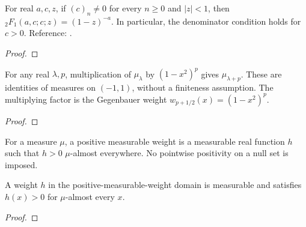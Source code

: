 \begin{supporting}
\begin{theorem}
\label{thm:hypergeometric-cancellation}
\leanok
For real $a,c,z$, if $(c)_n\ne0$ for every $n\ge0$ and $|z|<1$, then
${}_2F_1(a,c;c;z)=(1-z)^{-a}$. In particular, the denominator condition
holds for $c>0$. Reference: \cite[15.4.6]{dlmf}.
\end{theorem}
\begin{proof}
\leanok
\end{proof}

\begin{theorem}
\label{thm:gegenbauer-density-shift}
\leanok
For any real $\lambda,p$, multiplication of $\mu_\lambda$ by
$(1-x^2)^p$ gives $\mu_{\lambda+p}$. These are identities of measures
on $(-1,1)$, without a finiteness assumption. The multiplying factor is
the Gegenbauer weight $w_{p+1/2}(x)=(1-x^2)^p$.
\end{theorem}
\begin{proof}
\leanok
\end{proof}

\begin{definition}
\label{def:positive-measurable-weight}
\leanok
For a measure $\mu$, a positive measurable weight is a measurable real function $h$ such that $h>0$ $\mu$-almost everywhere.
No pointwise positivity on a null set is imposed.
\end{definition}
\begin{theorem}
\label{thm:positive-measurable-weight}
\leanok
A weight $h$ in the positive-measurable-weight domain is measurable and
satisfies $h(x)>0$ for $\mu$-almost every $x$.
\end{theorem}
\begin{proof}
\leanok
\end{proof}


\end{supporting}
